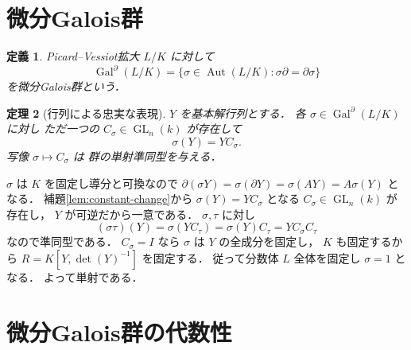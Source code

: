 \documentclass[a5paper,10pt,onecolumn]{jsarticle}
\makeatletter
\theoremstyle{mathnotetheorem}
\newtheorem{theorem}{定理}[section]
\newtheorem{definition}[theorem]{定義}
\renewcommand{\proofname}{証明}
\renewenvironment{proof}[1][\proofname]{%
  \par\pushQED{\qed}\normalfont\topsep4\p@\@plus2\p@\relax
  \trivlist\item[\hskip\labelsep\bfseries #1]\ignorespaces
}{\popQED\endtrivlist\@endpefalse}
\makeatother
\begin{document}
\section{微分Galois群}

\begin{definition}
Picard--Vessiot拡大 $L/K$ に対して
\[
 \operatorname{Gal}^\partial(L/K)
 =\{\sigma\in\operatorname{Aut}(L/K):
 \sigma\partial=\partial\sigma\}
\]
を微分Galois群という．
\end{definition}

\begin{theorem}[行列による忠実な表現]
\label{thm:matrix-group}
$Y$ を基本解行列とする．
各 $\sigma\in\operatorname{Gal}^\partial(L/K)$ に対し
ただ一つの $C_\sigma\in\operatorname{GL}_n(k)$ が存在して
\[
 \sigma(Y)=YC_\sigma.
\]
写像 $\sigma\mapsto C_\sigma$ は
群の単射準同型を与える．
\end{theorem}
\begin{proof}
$\sigma$ は $K$ を固定し導分と可換なので
$\partial(\sigma Y)=\sigma(\partial Y)
 =\sigma(AY)=A\sigma(Y)$ となる．
補題\ref{lem:constant-change}から
$\sigma(Y)=YC_\sigma$ となる
$C_\sigma\in\operatorname{GL}_n(k)$ が存在し，
$Y$ が可逆だから一意である．
$\sigma,\tau$ に対し
\[
 (\sigma\tau)(Y)=\sigma(YC_\tau)
 =\sigma(Y)C_\tau=YC_\sigma C_\tau
\]
なので準同型である．
$C_\sigma=I$ なら $\sigma$ は $Y$ の全成分を固定し，
$K$ も固定するから $R=K[Y,\det(Y)^{-1}]$ を固定する．
従って分数体 $L$ 全体を固定し $\sigma=1$ となる．
よって単射である．
\end{proof}

\section{微分Galois群の代数性}
\end{document}
